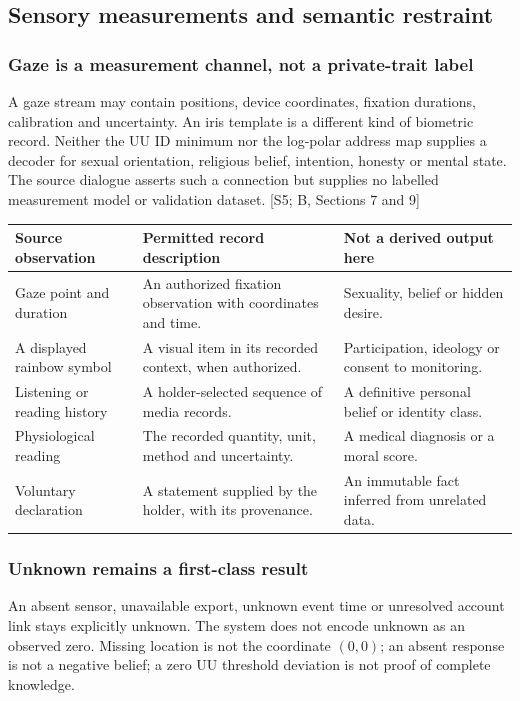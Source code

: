 \documentclass[11pt,a4paper]{article}
\newcommand{\newpagehead}[1]{\clearpage\subsection{#1}}
\newcommand{\source}[1]{{\sffamily\small\color{slate}[#1]}}
\begin{document}
\newpagehead{Sensory measurements and semantic restraint}
\subsubsection{Gaze is a measurement channel, not a private-trait label}
A gaze stream may contain positions, device coordinates, fixation durations, calibration and uncertainty. An iris template is a different kind of biometric record. Neither the UU ID minimum nor the log-polar address map supplies a decoder for sexual orientation, religious belief, intention, honesty or mental state. The source dialogue asserts such a connection but supplies no labelled measurement model or validation dataset. \source{S5; B, Sections 7 and 9}

\begin{center}\small\begin{tabularx}{\textwidth}{@{}p{}Xp{}@{}}\toprule
\textbf{Source observation} & \textbf{Permitted record description} & \textbf{Not a derived output here}\\\midrule
Gaze point and duration & An authorized fixation observation with coordinates and time. & Sexuality, belief or hidden desire.\\[7pt]
A displayed rainbow symbol & A visual item in its recorded context, when authorized. & Participation, ideology or consent to monitoring.\\[7pt]
Listening or reading history & A holder-selected sequence of media records. & A definitive personal belief or identity class.\\[7pt]
Physiological reading & The recorded quantity, unit, method and uncertainty. & A medical diagnosis or a moral score.\\[7pt]
Voluntary declaration & A statement supplied by the holder, with its provenance. & An immutable fact inferred from unrelated data.\\\bottomrule
\end{tabularx}\end{center}

\subsubsection{Unknown remains a first-class result}
An absent sensor, unavailable export, unknown event time or unresolved account link stays explicitly unknown. The system does not encode unknown as an observed zero. Missing location is not the coordinate $(0,0)$; an absent response is not a negative belief; a zero UU threshold deviation is not proof of complete knowledge.
\end{document}
